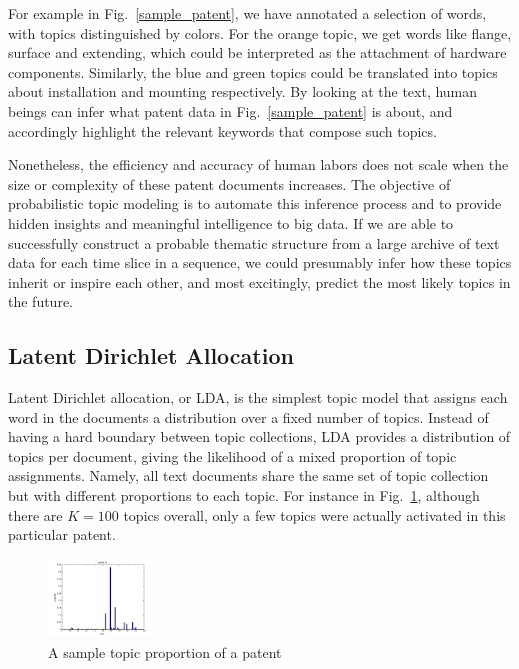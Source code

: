 \documentclass[conference]{IEEEtran}
\begin{document}
For example in Fig.~\ref{sample_patent}, we have annotated a selection of words, with topics distinguished by colors. For the orange topic, we get words like flange, surface and extending, which could be interpreted as the attachment of hardware components. Similarly, the blue and green topics could be translated into topics about installation and mounting respectively. By looking at the text, human beings can infer what patent data in Fig.~\ref{sample_patent} is about, and accordingly highlight the relevant keywords that compose such topics. 

Nonetheless, the efficiency and accuracy of human labors does not scale when the size or complexity of these patent documents increases. The objective of probabilistic topic modeling is to automate this inference process and to provide hidden insights and meaningful intelligence to big data. If we are able to successfully construct a probable thematic structure from a large archive of text data for each time slice in a sequence, we could presumably infer how these topics inherit or inspire each other, and most excitingly, predict the most likely topics in the future.




\subsection{Latent Dirichlet Allocation}
Latent Dirichlet allocation, or LDA, is the simplest topic model \cite{lda2003} that assigns each word in the documents a distribution over a fixed number of topics. Instead of having a hard boundary between topic collections, LDA provides a distribution of topics per document, giving the likelihood of a mixed proportion of topic assignments. Namely, all text documents share the same set of topic collection but with different proportions to each topic. For instance in Fig.~\ref{topic_proportion}, although there are $K=100$ topics overall, only a few topics were actually activated in this particular patent.

\begin{figure}[h]
	\center
	\includegraphics[width=0.25\textwidth]{fig/pat8_topics.png}
	\caption{A sample topic proportion of a patent}
	\label{topic_proportion}
\end{figure}
\end{document}
